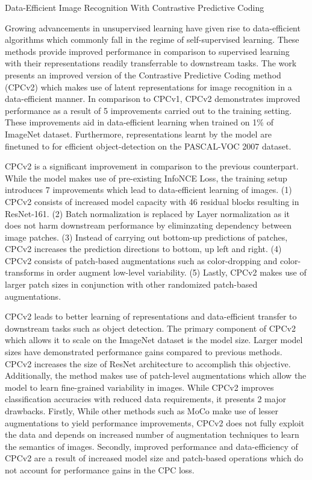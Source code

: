 \documentclass[11pt,letterpaper]{article}
\begin{document}
\begin{center}
  \large{Data-Efficient Image Recognition With Contrastive Predictive Coding}
\end{center}


Growing advancements in unsupervised learning have given rise to data-efficient algorithms which commonly fall in the regime of self-supervised learning. These methods provide improved performance in comparison to supervised learning with their representations readily transferrable to downstream tasks. The work presents an improved version of the Contrastive Predictive Coding method (CPCv2) which makes use of latent representations for image recognition in a data-efficient manner. In comparison to CPCv1, CPCv2 demonstrates improved performance as a result of 5 improvements carried out to the training setting. These improvements aid in data-efficient learning when trained on 1\% of ImageNet dataset. Furthermore, representations learnt by the model are finetuned to for efficient object-detection on the PASCAL-VOC 2007 dataset.

CPCv2 is a significant improvement in comparison to the previous counterpart. While the model makes use of pre-existing InfoNCE Loss, the training setup introduces 7 improvements which lead to data-efficient learning of images. (1) CPCv2 consists of increased model capacity with 46 residual blocks resulting in ResNet-161. (2) Batch normalization is replaced by Layer normalization as it does not harm downstream performance by eliminzating dependency between image patches. (3) Instead of carrying out bottom-up predictions of patches, CPCv2 increases the prediction directions to bottom, up left and right. (4) CPCv2 consists of patch-based augmentations such as color-dropping and color-transforms in order augment low-level variability. (5) Lastly, CPCv2 makes use of larger patch sizes in conjunction with other randomized patch-based augmentations.

CPCv2 leads to better learning of representations and data-efficient transfer to downstream tasks such as object detection. The primary component of CPCv2 which allows it to scale on the ImageNet dataset is the model size. Larger model sizes have demonstrated performance gains compared to previous methods. CPCv2 increases the size of ResNet architecture to accomplish this objective. Additionally, the method makes use of patch-level augmentations which allow the model to learn fine-grained variability in images. While CPCv2 improves classification accuracies with reduced data requirements, it presents 2 major drawbacks. Firstly, While other methods such as MoCo make use of lesser augmentations to yield performance improvements, CPCv2 does not fully exploit the data and depends on increased number of augmentation techniques to learn the semantics of images. Secondly, improved performance and data-efficiency of CPCv2 are a result of increased model size and patch-based operations which do not account for performance gains in the CPC loss. 
\end{document}
